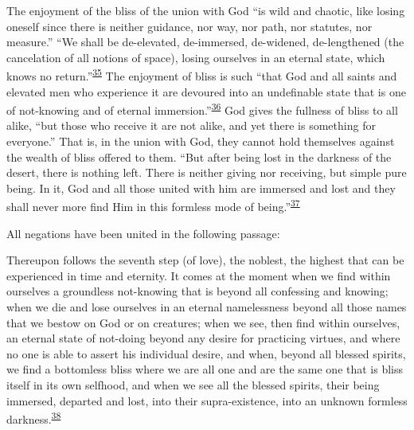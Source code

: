 The enjoyment of the bliss of the union with God ``is wild and chaotic,
like losing oneself since there is neither guidance, nor way, nor path,
nor statutes, nor measure.'' ``We shall be de-elevated, de-immersed,
de-widened, de-lengthened (the cancelation of all notions of space),
losing ourselves in an eternal state, which knows no
return.''\textsuperscript{\protect\hypertarget{17_Chapter_Ten__THE_FAILURE_OF_IMAG.xhtmlux5cux23id_667}{\protect\hyperlink{23_NOTES.xhtmlux5cux23id_668}{35}}}
The enjoyment of bliss is such ``that God and all saints and elevated
men who experience it are devoured into an undefinable state that is one
of not-knowing and of eternal
immersion.''\textsuperscript{\protect\hypertarget{17_Chapter_Ten__THE_FAILURE_OF_IMAG.xhtmlux5cux23id_665}{\protect\hyperlink{23_NOTES.xhtmlux5cux23id_666}{36}}}
God gives the fullness of bliss to all alike, ``but those who receive it
are not alike, and yet there is something for everyone.'' That is, in
the union with God, they cannot hold themselves against the wealth of
bliss offered to them. ``But after being lost in the darkness of the
desert, there is nothing left. There is neither giving nor receiving,
but simple pure being. In it, God and all those united with him are
immersed and lost and they shall never more find Him in this formless
mode of
being.''\textsuperscript{\protect\hypertarget{17_Chapter_Ten__THE_FAILURE_OF_IMAG.xhtmlux5cux23id_663}{\protect\hyperlink{23_NOTES.xhtmlux5cux23id_664}{37}}}

All negations have been united in the following passage:

Thereupon follows the seventh step (of love), the noblest, the highest
that can be experienced in time and eternity. It comes at the moment
when we find within ourselves a groundless not-knowing that is beyond
all confessing and knowing; when we die and lose ourselves in an eternal
\protect\hypertarget{17_Chapter_Ten__THE_FAILURE_OF_IMAG.xhtmlux5cux23page_261}{}{}namelessness
beyond all those names that we bestow on God or on creatures; when we
see, then find within ourselves, an eternal state of not-doing beyond
any desire for practicing virtues, and where no one is able to assert
his individual desire, and when, beyond all blessed spirits, we find a
bottomless bliss where we are all one and are the same one that is bliss
itself in its own selfhood, and when we see all the blessed spirits,
their being immersed, departed and lost, into their supra-existence,
into an unknown formless
darkness.\textsuperscript{\protect\hypertarget{17_Chapter_Ten__THE_FAILURE_OF_IMAG.xhtmlux5cux23id_661}{\protect\hyperlink{23_NOTES.xhtmlux5cux23id_662}{38}}}

